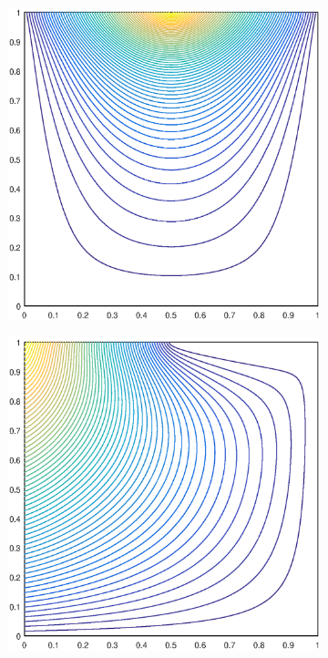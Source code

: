 \begin{figure}
\label{fig::2D_MAXENT1_deg_square_basis_functions}
\centering
	\begin{subfigure}[b]{0.35\textwidth}
		\centering
		\includegraphics[width=\textwidth]{figures/sec_BF/deg_square_MAXENT1_contour_b4.eps}
		\caption{}
	\end{subfigure}
	\vfill
	\begin{subfigure}[b]{0.35\textwidth}
		\centering
		\includegraphics[width=\textwidth]{figures/sec_BF/deg_square_MAXENT1_contour_b5.eps}

\end{subfigure}
\end{figure}
